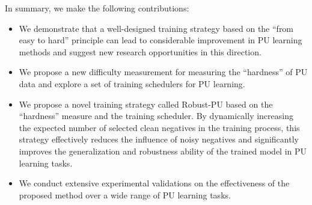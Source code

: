\documentclass[sigconf]{acmart}
\newcommand{\ourmethod}{Robust-PU\xspace}
\begin{document}





In summary, we make the following contributions:
\begin{itemize}
\item We demonstrate that a well-designed training strategy based on the ``from easy to hard'' principle can lead to considerable improvement in PU learning methods and suggest new research opportunities in this direction. 

\item We propose a new difficulty measurement for measuring the ``hardness'' of PU data and explore a set of training schedulers for PU learning. 

\item We propose a novel training strategy called \ourmethod based on the ``hardness'' measure and the training scheduler. By dynamically increasing the expected number of selected clean negatives in the training process, this strategy effectively reduces the influence of noisy negatives and significantly improves the generalization and robustness ability of the trained model in PU learning tasks. 
\item We conduct extensive experimental validations on the effectiveness of the proposed method over a wide range of PU learning tasks.
\end{itemize}
\end{document}
